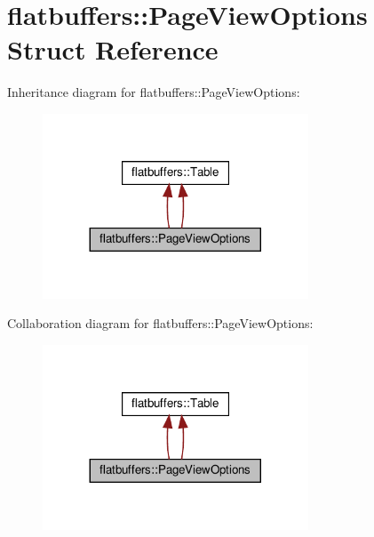 \hypertarget{structflatbuffers_1_1PageViewOptions}{}\section{flatbuffers\+:\+:Page\+View\+Options Struct Reference}
\label{structflatbuffers_1_1PageViewOptions}


Inheritance diagram for flatbuffers\+:\+:Page\+View\+Options\+:
\nopagebreak
\begin{figure}[H]
\begin{center}
\leavevmode
\includegraphics[width=224pt]{structflatbuffers_1_1PageViewOptions__inherit__graph}
\end{center}
\end{figure}


Collaboration diagram for flatbuffers\+:\+:Page\+View\+Options\+:
\nopagebreak
\begin{figure}[H]
\begin{center}
\leavevmode
\includegraphics[width=224pt]{structflatbuffers_1_1PageViewOptions__coll__graph}
\end{center}
\end{figure}
